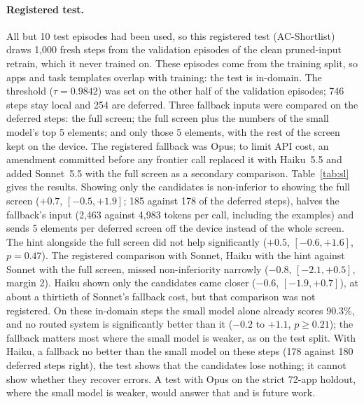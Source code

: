 \documentclass[10pt]{article}
\begin{document}
\paragraph{Registered test.} All but 10 test episodes had been used, so this registered test (AC-Shortlist) draws 1{,}000 fresh steps from the validation episodes of the clean pruned-input retrain, which it never trained on. These episodes come from the training split, so apps and task templates overlap with training: the test is in-domain. The threshold ($\tau=0.9842$) was set on the other half of the validation episodes; 746 steps stay local and 254 are deferred. Three fallback inputs were compared on the deferred steps: the full screen; the full screen plus the numbers of the small model's top 5 elements; and only those 5 elements, with the rest of the screen kept on the device. The registered fallback was Opus; to limit API cost, an amendment committed before any frontier call replaced it with Haiku~5.5 and added Sonnet~5.5 with the full screen as a secondary comparison. Table~\ref{tab:sl} gives the results. Showing only the candidates is non-inferior to showing the full screen ($+0.7$, $[-0.5, +1.9]$; 185 against 178 of the deferred steps), halves the fallback's input (2{,}463 against 4{,}983 tokens per call, including the examples) and sends 5 elements per deferred screen off the device instead of the whole screen. The hint alongside the full screen did not help significantly ($+0.5$, $[-0.6, +1.6]$, $p=0.47$). The registered comparison with Sonnet, Haiku with the hint against Sonnet with the full screen, missed non-inferiority narrowly ($-0.8$, $[-2.1, +0.5]$, margin 2). Haiku shown only the candidates came closer ($-0.6$, $[-1.9, +0.7]$), at about a thirtieth of Sonnet's fallback cost, but that comparison was not registered. On these in-domain steps the small model alone already scores 90.3\%, and no routed system is significantly better than it ($-0.2$ to $+1.1$, $p\ge0.21$); the fallback matters most where the small model is weaker, as on the test split. With Haiku, a fallback no better than the small model on these steps (178 against 180 deferred steps right), the test shows that the candidates lose nothing; it cannot show whether they recover errors. A test with Opus on the strict 72-app holdout, where the small model is weaker, would answer that and is future work.
\end{document}
